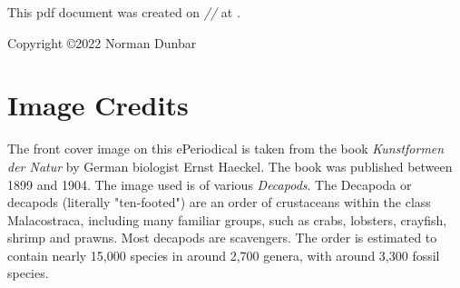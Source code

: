 \documentclass[11pt,fleqn]{book} %
\begin{document}


\noindent This pdf document was created on \textit{\the\day/\the\month/\the\year} at \textit{\DTMcurrenttime}.

\noindent Copyright \copyright 2022 Norman Dunbar\\ %



\pagestyle{empty} %


\tableofcontents %
\lstlistoflistings

\cleardoublepage %

\pagestyle{fancy} %




\chapter{Image Credits}
The front cover image on this ePeriodical is taken from the book \emph{Kunstformen der Natur} by German biologist Ernst Haeckel. The book was published between 1899 and 1904. The image used is of various \emph{Decapods}. The Decapoda or decapods (literally "ten-footed") are an order of crustaceans within the class Malacostraca, including many familiar groups, such as crabs, lobsters, crayfish, shrimp and prawns. Most decapods are scavengers. The order is estimated to contain nearly 15,000 species in around 2,700 genera, with around 3,300 fossil species.
\end{document}
